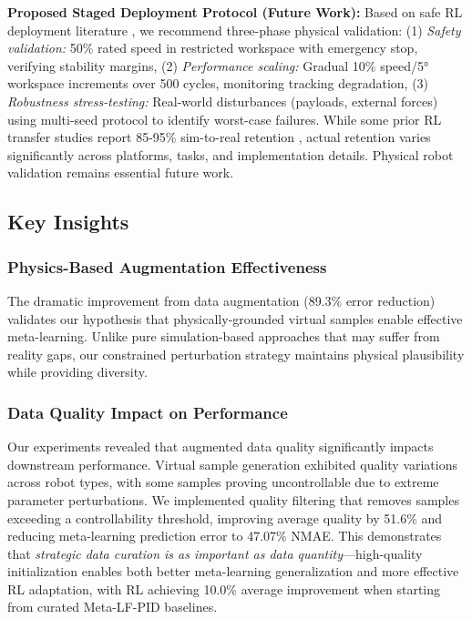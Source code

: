 \documentclass[a4paper]{cas-sc}
\begin{document}
\textbf{Proposed Staged Deployment Protocol (Future Work):} Based on safe RL deployment literature \cite{berkenkamp2021safe}, we recommend three-phase physical validation: (1) \textit{Safety validation:} 50\% rated speed in restricted workspace with emergency stop, verifying stability margins, (2) \textit{Performance scaling:} Gradual 10\% speed/5° workspace increments over 500 cycles, monitoring tracking degradation, (3) \textit{Robustness stress-testing:} Real-world disturbances (payloads, external forces) using multi-seed protocol to identify worst-case failures. While some prior RL transfer studies report 85-95\% sim-to-real retention \cite{zhao2020sim2real}, actual retention varies significantly across platforms, tasks, and implementation details. Physical robot validation remains essential future work.

\subsection{Key Insights}

\subsubsection{Physics-Based Augmentation Effectiveness}

The dramatic improvement from data augmentation (89.3\% error reduction) validates our hypothesis that physically-grounded virtual samples enable effective meta-learning. Unlike pure simulation-based approaches that may suffer from reality gaps, our constrained perturbation strategy maintains physical plausibility while providing diversity.

\subsubsection{Data Quality Impact on Performance}

Our experiments revealed that augmented data quality significantly impacts downstream performance. Virtual sample generation exhibited quality variations across robot types, with some samples proving uncontrollable due to extreme parameter perturbations. We implemented quality filtering that removes samples exceeding a controllability threshold, improving average quality by 51.6\% and reducing meta-learning prediction error to 47.07\% NMAE. This demonstrates that \textit{strategic data curation is as important as data quantity}—high-quality initialization enables both better meta-learning generalization and more effective RL adaptation, with RL achieving 10.0\% average improvement when starting from curated Meta-LF-PID baselines.
\end{document}
